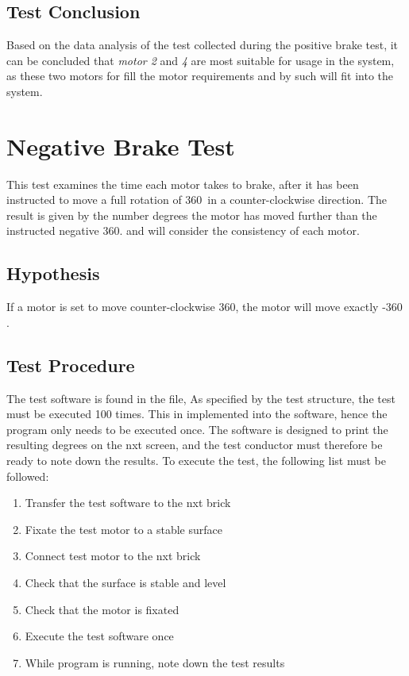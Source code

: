 \subsection{Test Conclusion}
Based on the data analysis of the test collected during the positive brake test, it can be concluded that \emph{motor 2} and \emph{4} are most suitable for usage in the system, as these two motors for fill the motor requirements and by such will fit into the system.

\section{Negative Brake Test}
This test examines the time each motor takes to brake, after it has been instructed to move a full rotation of 360\degree\ in a counter-clockwise direction. The result is given by the number degrees the motor has moved further than the instructed negative 360\degree . and will consider the consistency of each motor.

\subsection{Hypothesis} If a motor is set to move counter-clockwise 360\degree , the motor will move exactly -360 \degree .

\subsection{Test Procedure}
The test software is found in the file,  As specified by the test structure, the test must be executed 100 times. This in implemented into the software, hence the program only needs to be executed once.
The software is designed to print the resulting degrees on  the \gls{nxt} screen, and the test conductor must therefore be ready to note down the results. To execute the test, the following list must be followed:
\begin{enumerate}
  \item Transfer the test software to the \gls{nxt} brick
  \item Fixate the test motor to a stable surface
  \item Connect test motor to the \gls{nxt} brick
  \item Check that the surface is stable and level
  \item Check that the motor is fixated
  \item Execute the test software once
  \item While program is running, note down the test results
\end{enumerate}

